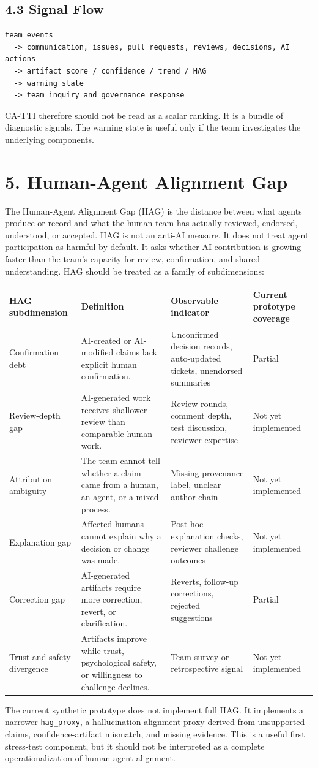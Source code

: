 \documentclass[11pt]{article}
\begin{document}
\subsection{4.3 Signal Flow}
\begin{Verbatim}[fontsize=\small]
team events
  -> communication, issues, pull requests, reviews, decisions, AI actions
  -> artifact score / confidence / trend / HAG
  -> warning state
  -> team inquiry and governance response
\end{Verbatim}
CA-TTI therefore should not be read as a scalar ranking. It is a bundle of diagnostic signals. The warning state is useful only if the team investigates the underlying components.
\section{5. Human-Agent Alignment Gap}
The Human-Agent Alignment Gap (HAG) is the distance between what agents produce or record and what the human team has actually reviewed, endorsed, understood, or accepted.
HAG is not an anti-AI measure. It does not treat agent participation as harmful by default. It asks whether AI contribution is growing faster than the team's capacity for review, confirmation, and shared understanding.
HAG should be treated as a family of subdimensions:
\begin{center}\small
\begin{tabularx}{\linewidth}{Y|Y|Y|Y}
\toprule
HAG subdimension & Definition & Observable indicator & Current prototype coverage \\
\midrule
Confirmation debt & AI-created or AI-modified claims lack explicit human confirmation. & Unconfirmed decision records, auto-updated tickets, unendorsed summaries & Partial \\
Review-depth gap & AI-generated work receives shallower review than comparable human work. & Review rounds, comment depth, test discussion, reviewer expertise & Not yet implemented \\
Attribution ambiguity & The team cannot tell whether a claim came from a human, an agent, or a mixed process. & Missing provenance label, unclear author chain & Not yet implemented \\
Explanation gap & Affected humans cannot explain why a decision or change was made. & Post-hoc explanation checks, reviewer challenge outcomes & Not yet implemented \\
Correction gap & AI-generated artifacts require more correction, revert, or clarification. & Reverts, follow-up corrections, rejected suggestions & Partial \\
Trust and safety divergence & Artifacts improve while trust, psychological safety, or willingness to challenge declines. & Team survey or retrospective signal & Not yet implemented \\
\bottomrule
\end{tabularx}
\end{center}
The current synthetic prototype does not implement full HAG. It implements a narrower \texttt{hag\_proxy}, a hallucination-alignment proxy derived from unsupported claims, confidence-artifact mismatch, and missing evidence. This is a useful first stress-test component, but it should not be interpreted as a complete operationalization of human-agent alignment.
\end{document}
